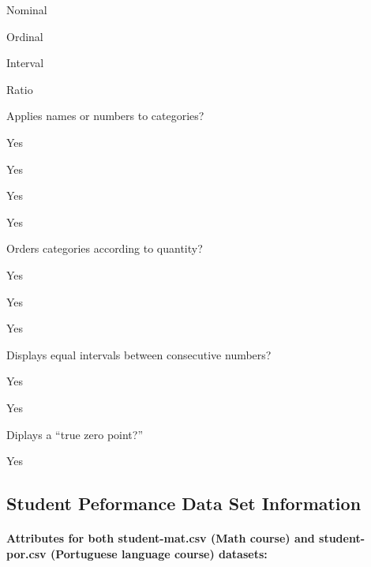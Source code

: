 \documentclass[
]{book}
\theoremstyle{definition}
\theoremstyle{definition}
\theoremstyle{definition}
\theoremstyle{definition}
\theoremstyle{remark}
\begin{document}
Nominal

Ordinal

Interval

Ratio

Applies names or numbers to categories?

Yes

Yes

Yes

Yes

Orders categories according to quantity?

Yes

Yes

Yes

Displays equal intervals between consecutive numbers?

Yes

Yes

Diplays a ``true zero point?''

Yes

\hypertarget{student-peformance-data-set-information}{%
\subsection{Student Peformance Data Set Information}\label{student-peformance-data-set-information}}

\hypertarget{attributes-for-both-student-mat.csv-math-course-and-student-por.csv-portuguese-language-course-datasets}{%
\paragraph{Attributes for both student-mat.csv (Math course) and student-por.csv (Portuguese language course) datasets:}\label{attributes-for-both-student-mat.csv-math-course-and-student-por.csv-portuguese-language-course-datasets}}
\end{document}
